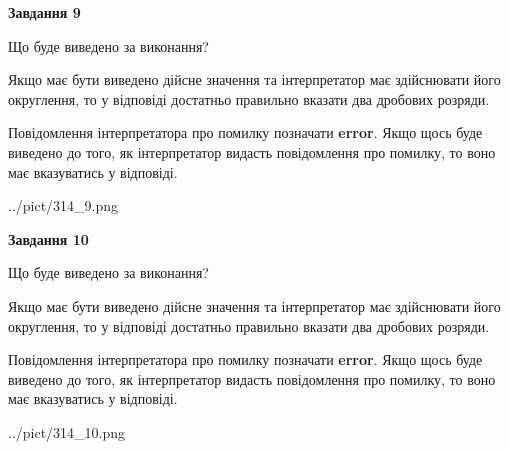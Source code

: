 \documentclass[12pt, ukrainian]{article}
\begin{document}
{\begin {Large}
{\begin {center}\textbf{Завдання 9}\end {center}}\par
Що буде виведено за виконання? \par

Якщо має бути виведено дійсне значення та інтерпретатор має здійснювати його округлення, 
то у відповіді достатньо правильно вказати два дробових розряди.

Повідомлення інтерпретатора про помилку позначати \textbf{error}.
Якщо щось буде виведено до того, як інтерпретатор видасть повідомлення про помилку, 
то воно має вказуватись у відповіді. \par

\begin{center}
	{../pict/314_9.png}
\end{center}
\newpage

{\begin {center}\textbf{Завдання 10}\end {center}}\par
Що буде виведено за виконання? \par

Якщо має бути виведено дійсне значення та інтерпретатор має здійснювати його округлення, 
то у відповіді достатньо правильно вказати два дробових розряди.

Повідомлення інтерпретатора про помилку позначати \textbf{error}.
Якщо щось буде виведено до того, як інтерпретатор видасть повідомлення про помилку, 
то воно має вказуватись у відповіді. \par

\begin{center}
	{../pict/314_10.png}
\end{center}
\newpage

\end {Large}}
\end{document}

